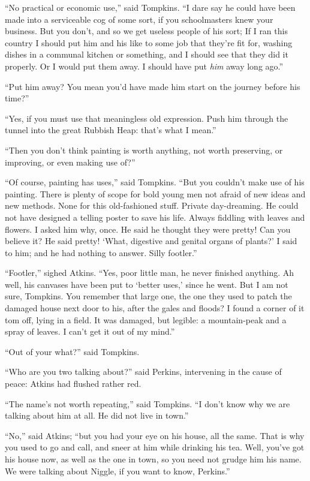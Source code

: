 \documentclass[english]{scrartcl}
\begin{document}
“No practical or economic use,” said Tompkins. “I dare say he could have been made into a serviceable cog of some sort, if you schoolmasters knew your business. But you don’t, and so we get useless people of his sort; If I ran this country I should put him and his like to some job that they’re fit for, washing dishes in a communal kitchen or something, and I should see that they did it properly. Or I would put them away. I should have put \emph{him} away long ago.”

“Put him away? You mean you’d have made him start on the journey before his time?”

“Yes, if you must use that meaningless old expression. Push him through the tunnel into the great Rubbish Heap: that’s what I mean.”

“Then you don’t think painting is worth anything, not worth preserving, or improving, or even making use of?”

“Of course, painting has uses,” said Tompkins. “But you couldn’t make use of his painting. There is plenty of scope for bold young men not afraid of new ideas and new methods. None for this old-fashioned stuff. Private day-dreaming. He could not have designed a telling poster to save his life. Always fiddling with leaves and flowers. I asked him why, once. He said he thought they were pretty! Can you believe it? He said pretty! ‘What, digestive and genital organs of plants?’ I said to him; and he had nothing to answer. Silly footler.”

“Footler,” sighed Atkins. “Yes, poor little man, he never finished anything. Ah well, his canvases have been put to ‘better uses,’ since he went. But I am not sure, Tompkins. You remember that large one, the one they used to patch the damaged house next door to his, after the gales and floods? I found a corner of it tom off, lying in a field. It was damaged, but legible: a mountain-peak and a spray of leaves. I can’t get it out of my mind.”

“Out of your what?” said Tompkins.

“Who are you two talking about?” said Perkins, intervening in the cause of peace: Atkins had flushed rather red.

“The name’s not worth repeating,” said Tompkins. “I don’t know why we are talking about him at all. He did not live in town.”

“No,” said Atkins; “but you had your eye on his house, all the same. That is why you used to go and call, and sneer at him while drinking his tea. Well, you’ve got his house now, as well as the one in town, so you need not grudge him his name. We were talking about Niggle, if you want to know, Perkins.”
\end{document}

